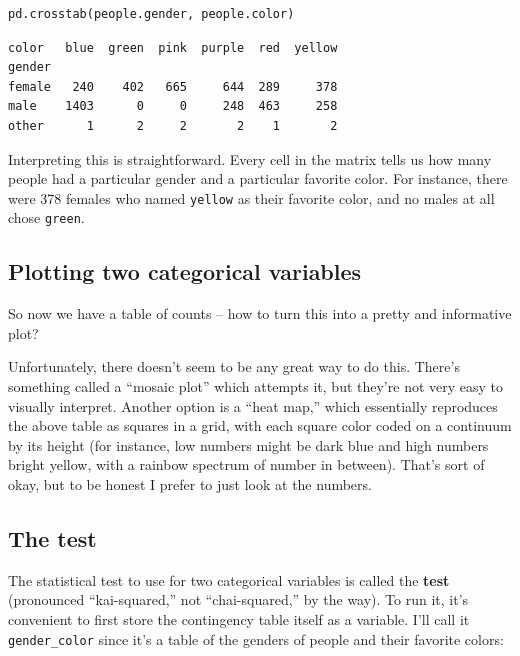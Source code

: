 \begin{Verbatim}[fontsize=\small,samepage=true,frame=single,framesep=3mm]
pd.crosstab(people.gender, people.color)
\end{Verbatim}
\vspace{-.2in}

\begin{Verbatim}[fontsize=\small,samepage=true,frame=leftline,framesep=5mm,framerule=1mm]
color   blue  green  pink  purple  red  yellow
gender                                        
female   240    402   665     644  289     378
male    1403      0     0     248  463     258
other      1      2     2       2    1       2
\end{Verbatim}

Interpreting this is straightforward. Every cell in the matrix tells us how
many people had a particular gender and a particular favorite color. For
instance, there were 378 females who named \texttt{yellow} as their favorite
color, and no males at all chose \texttt{green}.


\subsection{Plotting two categorical variables}

So now we have a table of counts -- how to turn this into a pretty and
informative plot?

Unfortunately, there doesn't seem to be any great way to do this. There's
something called a ``mosaic plot'' which attempts it, but they're not very easy
to visually interpret. Another option is a ``heat map,'' which essentially
reproduces the above table as squares in a grid, with each square color coded
on a continuum by its height (for instance, low numbers might be dark blue and
high numbers bright yellow, with a rainbow spectrum of number in between).
That's sort of okay, but to be honest I prefer to just look at the numbers.

\subsection{The  test}


The statistical test to use for two categorical variables is called the
\textbf{ test} (pronounced ``kai-squared,'' not ``chai-squared,'' by
the way). To run it, it's convenient to first store the contingency table
itself as a variable. I'll call it \texttt{gender\_color} since it's a table of
the genders of people and their favorite colors:

